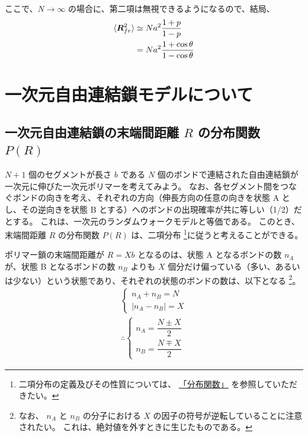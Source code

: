 \documentclass[uplatex,dvipdfmx,a4paper,11pt, titlepage]{jsarticle}
\begin{document}
\begin{appendix}
ここで、$N \rightarrow \infty$ の場合に、第二項は無視できるようになるので、結局、
\begin{align*}
	\langle \bm{R}_{fr}^2 \rangle
		&\simeq N a^2 \dfrac{1+p}{1-p} \notag \\
		&= N a^2 \dfrac{1+\cos \theta}{1-\cos \theta}
\end{align*}

\newpage

\section{一次元自由連結鎖モデルについて}
\label{sec:1DRW}

\subsection{一次元自由連結鎖の末端間距離 $R$ の分布関数 $P(R)$}
\label{ssec:1DRW_PR}

$N+1$ 個のセグメントが長さ $b$ である $N$ 個のボンドで連結された自由連結鎖が一次元に伸びた一次元ポリマーを考えてみよう。
なお、各セグメント間をつなぐボンドの向きを考え、それぞれの方向（伸長方向の任意の向きを状態 A とし、その逆向きを状態 B とする）へのボンドの出現確率が共に等しい（1/2）だとする。
これは、一次元のランダムウォークモデルと等価である。
このとき、末端間距離 $R$ の分布関数 $P(R)$ は、二項分布
\footnote
{
二項分布の定義及びその性質については、
\href{https://dl.dropboxusercontent.com/u/18899343/Probability/Prob_Dist/Prob_Dist.pdf}{「分布関数」}
を参照していただきたい。
}に従うと考えることができる。

ポリマー鎖の末端間距離が $R = Xb$ となるのは、状態 A となるボンドの数 $n_A$ が、状態 B となるボンドの数 $n_B$ よりも $X$ 個分だけ偏っている（多い、あるいは少ない）という状態であり、それぞれの状態のボンドの数は、以下となる
\footnote
{
なお、 $n_A$ と $n_B$ の分子における $X$ の因子の符号が逆転していることに注意されたい。
これは、絶対値を外すときに生じたものである。
}。
\begin{align*}
\begin{cases}
n_A +n_B = N \\[8pt]
| n_A - n_B | = X
\end{cases}\\[10pt]
\therefore
\begin{cases}
n_A = \dfrac{N \pm X}{2} \\[8pt]
n_B = \dfrac{N \mp X}{2}
\end{cases}
\end{align*}


\end{appendix}
\end{document}
